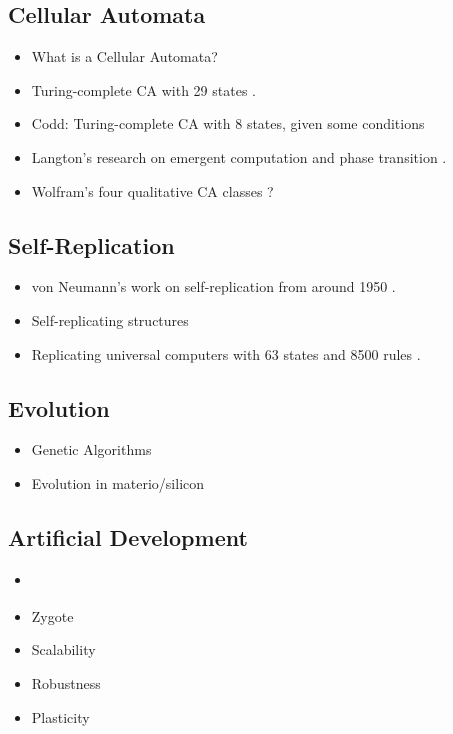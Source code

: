 \subsection{Cellular Automata}

\begin{itemize}
    \item What is a Cellular Automata?
    \item Turing-complete CA with 29 states \cite{neumann1966selfreplication}.
    \item Codd: Turing-complete CA with 8 states, given some conditions \cite{codd1968cellular}
    \item Langton's research on emergent computation and phase transition \cite{langton1990edgeofchaos}.
    \item Wolfram's four qualitative CA classes \cite{wolfram1984complexity}?
\end{itemize}

\subsection{Self-Replication}

\begin{itemize}
    \item von Neumann's work on self-replication from around 1950 \cite{neumann1966selfreplication}.
    \item Self-replicating structures \cite{reggia1998neumann}
    \item Replicating universal computers with 63 states and 8500 rules \cite{perrier1996toward}.
\end{itemize}

\subsection{Evolution}

\begin{itemize}
    \item Genetic Algorithms
    \item Evolution in materio/silicon \cite{miller2014evolution}
\end{itemize}

\subsection{Artificial Development}

\begin{itemize}
    \item \cite{harding2008artificial} \cite{tufte2008evodevo}
    \item Zygote
    \item Scalability
    \item Robustness
    \item Plasticity
\end{itemize}

